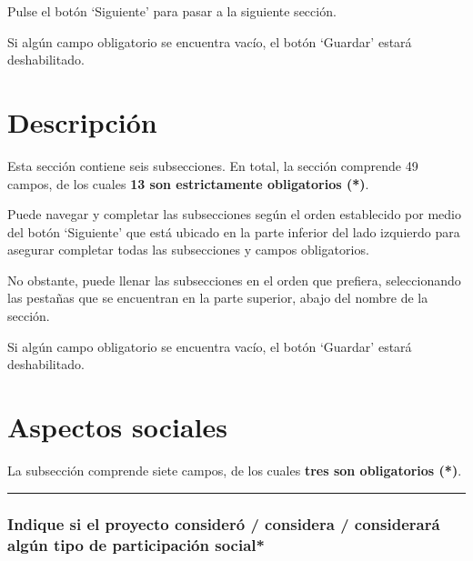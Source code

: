 \documentclass[
]{book}
\begin{document}
Pulse el botón `Siguiente' para pasar a la siguiente sección.

Si algún campo obligatorio se encuentra vacío, el botón `Guardar' estará deshabilitado.

\hypertarget{descripciuxf3n}{%
\chapter{Descripción}\label{descripciuxf3n}}

Esta sección contiene seis subsecciones. En total, la sección comprende 49 campos, de los cuales \textbf{13 son estrictamente obligatorios ({*})}.

Puede navegar y completar las subsecciones según el orden establecido por medio del botón `Siguiente' que está ubicado en la parte inferior del lado izquierdo para asegurar completar todas las subsecciones y campos obligatorios.

No obstante, puede llenar las subsecciones en el orden que prefiera, seleccionando las pestañas que se encuentran en la parte superior, abajo del nombre de la sección.

Si algún campo obligatorio se encuentra vacío, el botón `Guardar' estará deshabilitado.

\hypertarget{aspectos-sociales}{%
\chapter*{Aspectos sociales}\label{aspectos-sociales}}

La subsección comprende siete campos, de los cuales \textbf{tres son obligatorios ({*})}.

\begin{center}\rule{0.5\linewidth}{0.5pt}\end{center}

\hypertarget{indique-si-el-proyecto-consideruxf3-considera-consideraruxe1-alguxfan-tipo-de-participaciuxf3n-social}{%
\subsection*{\texorpdfstring{{Indique si el proyecto consideró / considera / considerará algún tipo de participación social*}}{Indique si el proyecto consideró / considera / considerará algún tipo de participación social*}}\label{indique-si-el-proyecto-consideruxf3-considera-consideraruxe1-alguxfan-tipo-de-participaciuxf3n-social}}
\end{document}
